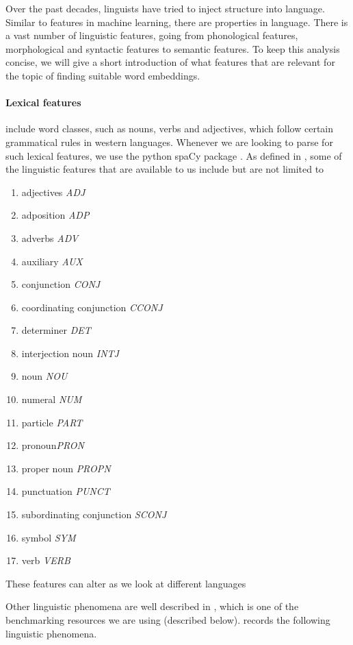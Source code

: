 \documentclass[a4paper,12pt,twoside,openright]{report}
\begin{document}
Over the past decades, linguists have tried to inject structure into language. 
Similar to features in machine learning, there are properties in language. 
There is a vast number of linguistic features, going from phonological features, morphological and syntactic features to semantic features.
To keep this analysis concise, we will give a short introduction of what features that are relevant for the topic of finding suitable word embeddings.

\paragraph{Lexical features} include word classes, such as nouns, verbs and adjectives, which follow certain grammatical rules in western languages.
Whenever we are looking to parse for such lexical features, we use the python spaCy package \cite{spacy}.
As defined in \cite{spacyb}, some of the linguistic features that are available to us include but are not limited to

\begin{enumerate}
\item adjectives \textit{ADJ}
\item adposition \textit{ADP}
\item adverbs \textit{ADV}
\item auxiliary \textit{AUX}
\item conjunction \textit{CONJ}
\item coordinating conjunction \textit{CCONJ}
\item determiner \textit{DET}
\item interjection noun \textit{INTJ}
\item noun \textit{NOU}
\item numeral \textit{NUM}
\item particle \textit{PART}
\item pronoun\textit{PRON}
\item proper noun \textit{PROPN}
\item punctuation \textit{PUNCT}
\item subordinating conjunction \textit{SCONJ}
\item symbol \textit{SYM}
\item verb \textit{VERB}
\end{enumerate}

These features can alter as we look at different languages

Other linguistic phenomena are well described in \cite{wang19}, which is one of the benchmarking resources we are using (described below).
\cite{wang19} records the following linguistic phenomena.
\end{document}
